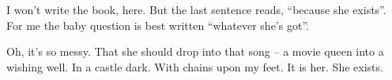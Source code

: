

I won't write the book, here.  But the last sentence reads, ``because
she exists''.  For me the baby question is best written ``whatever
she's got''.

Oh, it's so messy.  That she should drop into that song -- a movie
queen into a wishing well.  In a castle dark.  With chains upon my
feet.  It is her.  She exists.

\bye
